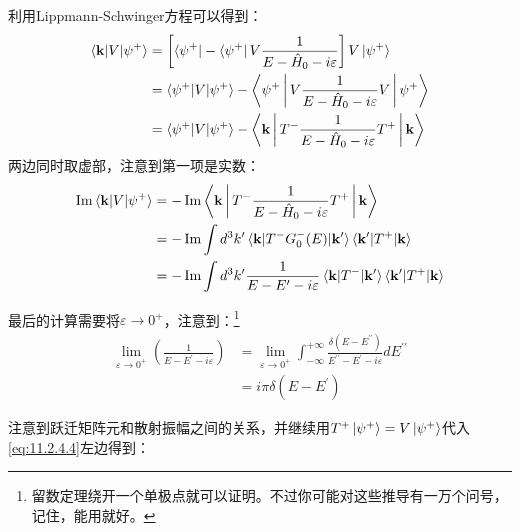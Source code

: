 \documentclass[a4paper,zihao=-4,linespread=1]{ctexrep}
\begin{document}
	利用Lippmann-Schwinger方程可以得到：
	\begin{equation}
		\label{eq:11.2.4.3}
		\begin{aligned}
			\braket{\mathbf{k}|V|\psi^+}&=\left[\bra{\psi^+}-\bra{\psi^+}V\frac{1}{E-\hat{H}_0-i\varepsilon}\right]V\ket{\psi^+}\\
			&=\braket{\psi^+|V|\psi^+}-\Braket{\psi^+|V\frac{1}{E-\hat{H}_0-i\varepsilon}V|\psi^+}\\
			&=\braket{\psi^+|V|\psi^+}-\Braket{\mathbf{k}|T^-\frac{1}{E-\hat{H}_0-i\varepsilon}T^+|\mathbf{k}}
		\end{aligned}
	\end{equation}
	两边同时取虚部，注意到第一项是实数：
	\begin{equation}
		\label{eq:11.2.4.4}
		\begin{aligned}
			\operatorname{Im}\braket{\mathbf{k}|V|\psi^+}&=-\operatorname{Im}\Braket{\mathbf{k}|T^-\frac{1}{E-\hat{H}_0-i\varepsilon}T^+|\mathbf{k}}\\
			&=-\operatorname{Im}\int d^3k^\prime\braket{\mathbf{k}|T^-G_0^-(E)|\mathbf{k}^\prime} \braket{\mathbf{k}^\prime|T^+|\mathbf{k}}\\
			&=	-\operatorname{Im}\int d^3k^\prime\frac{1}{E-E^\prime-i\varepsilon}\braket{\mathbf{k}|T^-|\mathbf{k}^\prime} \braket{\mathbf{k}^\prime|T^+|\mathbf{k}}\\
		\end{aligned}
	\end{equation}
	
	最后的计算需要将$\varepsilon\to 0^+$，注意到：\footnote{留数定理绕开一个单极点就可以证明。不过你可能对这些推导有一万个问号，记住，能用就好。}
	\begin{equation}
		\begin{aligned}
			\lim_{\varepsilon\to 0^+} \left(\frac{1}{E-E^\prime-i\varepsilon}\right)&=\lim_{\varepsilon\to 0^+} \int_{-\infty}^{+\infty}\frac{\delta(E-E^{\prime\prime})}{E^{\prime\prime}-E^\prime-i\varepsilon}dE^{\prime\prime}\\
			&=i\pi\delta(E-E^\prime)
		\end{aligned}
	\end{equation}

	注意到跃迁矩阵元和散射振幅之间的关系，并继续用$T^+\ket{\psi^+}=V\ket{\psi^+}$代入\ref{eq:11.2.4.4}左边得到：
	
\end{document}

